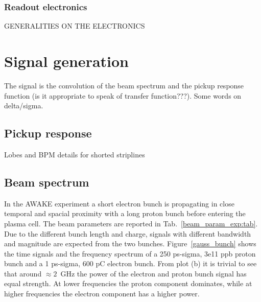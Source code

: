 \subsubsection{Readout electronics}

GENERALITIES ON THE ELECTRONICS


\section[Signal generation]{Signal generation}

The signal is the convolution of the beam spectrum and the pickup response function (is it appropriate to speak of transfer function???). Some words on delta/sigma.

\subsection[Pickup response]{Pickup response}

Lobes and BPM details for shorted striplines

\subsection[Beam spectrum]{Beam spectrum}

In the AWAKE experiment a short electron bunch is propagating in close temporal and spacial proximity with a long proton bunch before entering the plasma cell. The beam parameters are reported in Tab.~\ref{beam_param_exp:tab}. Due to the different bunch length and charge, signals with different bandwidth and magnitude are expected from the two bunches. Figure~\ref{gauss_bunch} shows the time signals and the frequency spectrum of a 250 ps-sigma, 3e11 ppb proton bunch and a 1 ps-sigma, 600 pC electron bunch. From plot (b) it is trivial to see that around $\approx2$~GHz the power of the electron and proton bunch signal has equal strength. At lower frequencies the proton component dominates, while at higher frequencies the electron component has a higher power.

